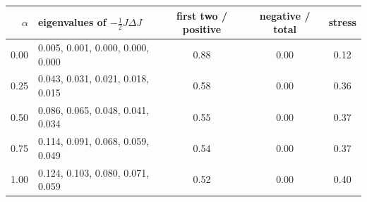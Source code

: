 \begin{tabular}{rlccc}
\toprule
$\alpha$ & eigenvalues of $-\frac12J\Delta J$ & first two / positive & negative / total & stress\\
\midrule
0.00 & 0.005, 0.001, 0.000, 0.000, 0.000 & 0.88 & 0.00 & 0.12\\
0.25 & 0.043, 0.031, 0.021, 0.018, 0.015 & 0.58 & 0.00 & 0.36\\
0.50 & 0.086, 0.065, 0.048, 0.041, 0.034 & 0.55 & 0.00 & 0.37\\
0.75 & 0.114, 0.091, 0.068, 0.059, 0.049 & 0.54 & 0.00 & 0.37\\
1.00 & 0.124, 0.103, 0.080, 0.071, 0.059 & 0.52 & 0.00 & 0.40\\
\bottomrule
\end{tabular}
